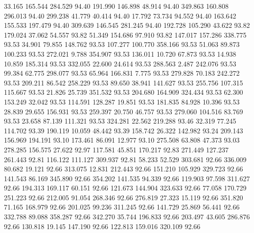   33.165  165.544  284.529        94.40
 191.990  146.898   48.914        94.40
 349.863  160.808  296.013        94.40
 299.238   41.779   40.414        94.40
  17.792   73.734   94.552        94.40
 163.642  155.533  197.479        94.40
 309.639  146.545  281.245        94.40
 192.728  105.290   43.622        93.82
 179.024   37.062   54.557        93.82
  51.349  154.686   97.910        93.82
 147.017  157.286  338.775        93.53
  34.901   79.855  148.762        93.53
 107.277  100.770  358.166        93.53
  51.063   89.873  100.233        93.53
 272.021    9.788  354.907        93.53
 136.011   10.720   67.873        93.53
  14.938   10.859  185.314        93.53
 332.055   22.600   24.614        93.53
 288.563    2.487  242.076        93.53
  99.384   62.775  298.077        93.53
  65.964  166.831    7.775        93.53
 279.828   70.183  242.272        93.53
 209.211   86.542  258.229        93.53
  89.650   38.941  141.627        93.53
 255.756  107.315  115.667        93.53
  21.826   25.739  351.532        93.53
 204.680  164.909  324.434        93.53
  62.300  153.249   32.042        93.53
 114.591  128.287   19.851        93.53
 181.835   84.928   10.396        93.53
  28.839   29.655  156.931        93.53
 259.397   20.750   46.757        93.53
 279.060  104.516   83.769        93.53
  23.658   87.139  111.321        93.53
 324.281   22.562  219.288        93.46
  32.319   77.245  114.702        93.39
 190.119   10.059   48.442        93.39
 158.742   26.322  142.982        93.24
 209.143  156.969  194.191        93.10
 173.461   86.091   12.977        93.10
 275.508   63.808   47.373        93.03
 278.285  156.575   27.622        92.97
 117.581   45.851  170.217        92.83
 271.449  127.237  261.443        92.81
 116.122  111.127  309.937        92.81
  58.233   52.529  303.681        92.66
 336.009   80.682   19.121        92.66
 313.075   12.831  212.443        92.66
 151.210  105.929  329.723        92.66
 141.543   86.169  345.890        92.66
 354.202  141.535   94.339        92.66
 119.903   97.598  311.627        92.66
 194.313  169.117   60.151        92.66
 121.673  144.904  323.633        92.66
  77.058  170.729  251.223        92.66
 212.005   91.054  268.346        92.66
 276.819   27.323   15.119        92.66
 351.820   71.165  168.979        92.66
 201.025   99.236  311.245        92.66
 141.729   25.869   56.441        92.66
 332.788   89.088  358.287        92.66
 342.270   35.744  196.833        92.66
 203.497   43.605  286.876        92.66
 130.818   19.145  147.190        92.66
 122.813  159.016  320.109        92.66
